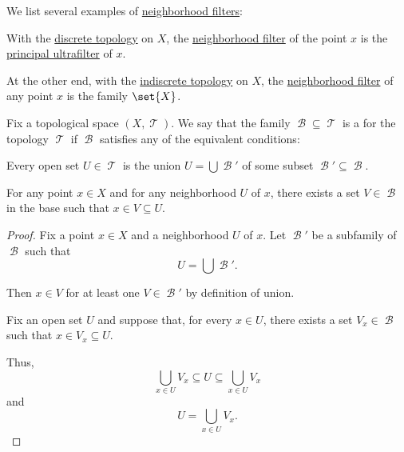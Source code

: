\begin{example}\label{ex:def:topological_neighborhood}
  We list several examples of \hyperref[def:topological_neighborhood]{neighborhood filters}:
  \begin{thmenum}
     With the \hyperref[def:discrete_topology]{discrete topology} on \( X \), the \hyperref[def:topological_neighborhood]{neighborhood filter} of the point \( x \) is the \hyperref[ex:principal_ultrafilter]{principal ultrafilter} of \( x \).

     At the other end, with the \hyperref[def:indiscrete_topology]{indiscrete topology} on \( X \), the \hyperref[def:topological_neighborhood]{neighborhood filter} of any point \( x \) is the family \( \set{ X } \).
  \end{thmenum}
\end{example}

\begin{definition}\label{def:topological_base}
  Fix a topological space \( (X, \mscrT) \). We say that the family \( \mscrB \subseteq \mscrT \) is a  for the topology \( \mscrT \) if \( \mscrB \) satisfies any of the equivalent conditions:
  \begin{thmenum}
     Every open set \( U \in \mscrT \) is the union \( U = \bigcup \mscrB' \) of some subset \( \mscrB' \subseteq \mscrB \).

    \medskip

     For any point \( x \in X \) and for any neighborhood \( U \) of \( x \), there exists a set \( V \in \mscrB \) in the base such that \( x \in V \subseteq U \).
  \end{thmenum}
\end{definition}
\begin{proof}
   Fix a point \( x \in X \) and a neighborhood \( U \) of \( x \). Let \( \mscrB' \) be a subfamily of \( \mscrB \) such that
  \begin{equation*}
    U = \bigcup \mscrB'.
  \end{equation*}

  Then \( x \in V \) for at least one \( V \in \mscrB' \) by definition of union.

   Fix an open set \( U \) and suppose that, for every \( x \in U \), there exists a set \( V_x \in \mscrB \) such that \( x \in V_x \subseteq U \).

  Thus,
  \begin{equation*}
    \bigcup_{x \in U} V_x \subseteq U \subseteq \bigcup_{x \in U} V_x
  \end{equation*}
  and
  \begin{equation*}
    U = \bigcup_{x \in U} V_x.
  \end{equation*}
\end{proof}

